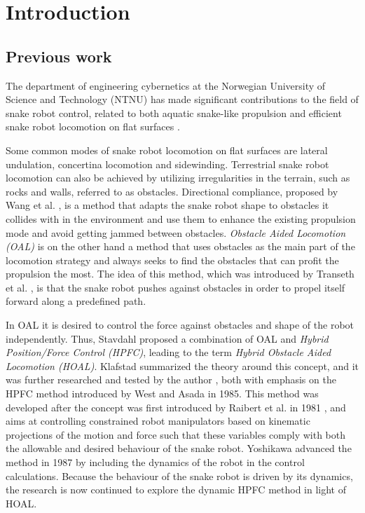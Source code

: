 
\chapter{Introduction}\label{Chapter:introduction}

\section{Previous work}

The department of engineering cybernetics at the Norwegian University of Science and Technology (NTNU) has made significant contributions to the field of snake robot control, related to both aquatic snake-like propulsion and efficient snake robot locomotion on flat surfaces \cite{StavdahlNote}.

Some common modes of snake robot locomotion on flat surfaces are lateral undulation, concertina locomotion and sidewinding. Terrestrial snake robot locomotion can also be achieved by utilizing irregularities in the terrain, such as rocks and walls, referred to as obstacles. Directional compliance, proposed by Wang et al. \cite{wang2020directional}, is a method that adapts the snake robot shape to obstacles it collides with in the environment and use them to enhance the existing propulsion mode and avoid getting jammed between obstacles. \textit{Obstacle Aided Locomotion (OAL)} is on the other hand a method that uses obstacles as the main part of the locomotion strategy and always seeks to find the obstacles that can profit the propulsion the most. The idea of this method, which was introduced by Transeth et al. \cite{transeth2008snake}, is that the snake robot pushes against obstacles in order to propel itself forward along a predefined path.


In OAL it is desired to control the force against obstacles and shape of the robot independently. Thus, Stavdahl \cite{StavdahlNote} proposed a combination of OAL and \textit{Hybrid Position/Force Control (HPFC)}, leading to the term \textit{Hybrid Obstacle Aided Locomotion (HOAL)}. Klafstad \cite{TorjusOppg} summarized the theory around this concept, and it was further researched and tested by the author \cite{AtussaProsjektoppgp}, both with emphasis on the HPFC method introduced by West and Asada \cite{west1985method} in 1985. This method was developed after the concept was first introduced by Raibert et al. in 1981 \cite{raibert1981hybrid}, and aims at controlling constrained robot manipulators based on kinematic projections of the motion and force such that these variables comply with both the allowable and desired behaviour of the snake robot. Yoshikawa \cite{yoshikawa1987dynamic} advanced the method in 1987 by including the dynamics of the robot in the control calculations. Because the behaviour of the snake robot is driven by its dynamics, the research is now continued to explore the dynamic HPFC method in light of HOAL. 


